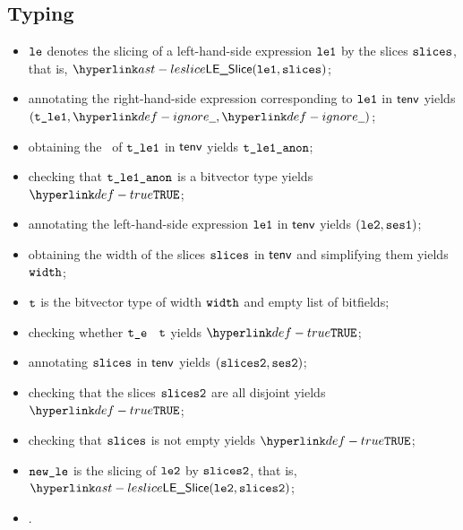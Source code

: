 \subsection{Typing}
\ProseParagraph
\AllApply
\begin{itemize}
  \item $\texttt{le}$ denotes the slicing of a left-hand-side expression $\texttt{le1}$ by the slices $\texttt{slices}$, that is, $\LESlice(\vleone, \slices)$;
  \item annotating the right-hand-side expression corresponding to $\texttt{le1}$ in $\textsf{tenv}$ yields \\
        $(\vtleone, \Ignore, \Ignore)$\ProseOrTypeError;
  \item obtaining the \underlyingtype\ of $\texttt{t\_le1}$ in $\textsf{tenv}$ yields $\texttt{t\_le1\_anon}$\ProseOrTypeError;
  \item checking that $\texttt{t\_le1\_anon}$ is a bitvector type yields $\True$\ProseTerminateAs{\UnexpectedType};
  \item annotating the left-hand-side expression $\texttt{le1}$ in $\textsf{tenv}$ yields $(\texttt{le2}, \texttt{ses1})$\ProseOrTypeError;
  \item obtaining the width of the slices $\texttt{slices}$ in $\textsf{tenv}$ and simplifying them yields $\texttt{width}$;
  \item $\texttt{t}$ is the bitvector type of width $\texttt{width}$ and empty list of bitfields;
  \item checking whether $\texttt{t\_e}$ \typesatisfies\ $\texttt{t}$ yields $\True$\ProseOrTypeError;
  \item annotating $\texttt{slices}$ in $\textsf{tenv}$ yields $(\texttt{slices2}, \texttt{ses2})$\ProseOrTypeError;
  \item checking that the slices $\texttt{slices2}$ are all disjoint yields $\True$\ProseOrTypeError;
  \item checking that $\texttt{slices}$ is not empty yields $\True$\ProseTerminateAs{\BadSlices};
  \item $\texttt{new\_le}$ is the slicing of $\texttt{le2}$ by $\texttt{slices2}$, that is, $\LESlice(\vletwo, \slicestwo)$;
  \item {}.
\end{itemize}
\FormallyParagraph
